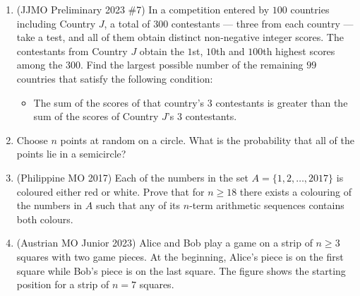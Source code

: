 \documentclass[11pt,letterpaper]{article}
\begin{document}
\begin{enumerate}[resume]
    \item (JJMO Preliminary 2023 \#7) In a competition entered by $100$ countries including Country $J$, a total of $300$ contestants --- three from each country --- take a test, and all of them obtain distinct non-negative integer scores. The contestants from Country $J$ obtain the $1$st, $10$th and $100$th highest scores among the $300$. Find the largest possible number of the remaining $99$ countries that satisfy the following condition:
    \begin{itemize}
        \item The sum of the scores of that country's $3$ contestants is greater than the sum of the scores of Country $J$'s $3$ contestants.
    \end{itemize}

    \item Choose $n$ points at random on a circle. What is the probability that all of the points lie in a semicircle?

    \item (Philippine MO 2017) Each of the numbers in the set $A=\{1,2,\dots,2017\}$ is coloured either red or white. Prove that for $n\ge 18$ there exists a colouring of the numbers in $A$ such that any of its $n$-term arithmetic sequences contains both colours.

    \item (Austrian MO Junior 2023) Alice and Bob play a game on a strip of $n\ge 3$ squares with two game pieces. At the beginning, Alice's piece is on the first square while Bob's piece is on the last square. The figure shows the starting position for a strip of $n=7$ squares.
    \begin{center}
\end{center}
\end{enumerate}
\end{document}
